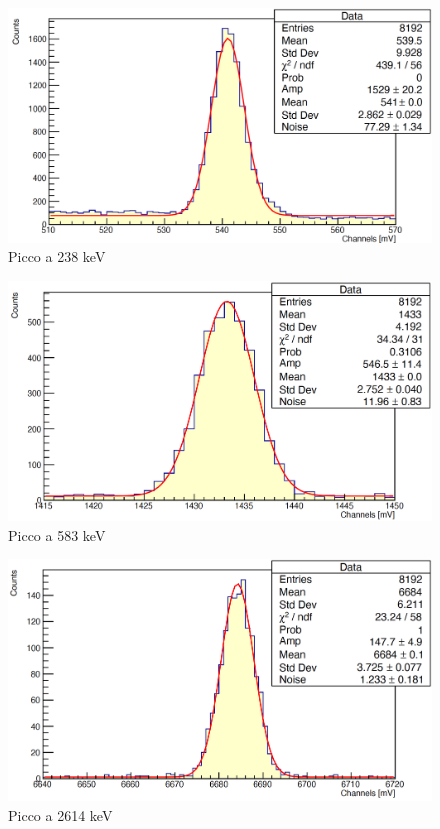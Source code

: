 \documentclass[a4paper,10pt]{article}
\begin{document}
\begin{figure}[H]
    \centering
    \includegraphics[scale=0.45]{appendice/spettri/ThCu1_54}
    \caption{Picco a 238 keV}
\end{figure}
\begin{figure}[H]
    \centering
    \includegraphics[scale=0.45]{appendice/spettri/ThCu2_54}
    \caption{Picco a 583 keV}
\end{figure}
\begin{figure}[H]
    \centering
    \includegraphics[scale=0.45]{appendice/spettri/ThCu3_54}
    \caption{Picco a 2614 keV}
\end{figure}
\end{document}

